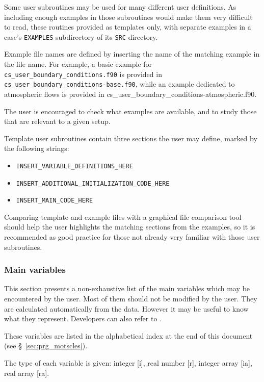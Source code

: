 {{{Some user subroutines may be used for many different user definitions. As
including enough examples in those subroutines would make them very
difficult to read, these routines provided as templates only, with
separate examples in a case's \texttt{EXAMPLES} subdirectory of its
\texttt{SRC} directory.

Example file names are defined by inserting the name of the matching example
in the file name. For example, a basic example for
\texttt{cs\_user\_boundary\_conditions.f90} is provided in \\
\texttt{cs\_user\_boundary\_conditions-base.f90}, while an example dedicated
to atmospheric flows is provided in
{cs\_user\_boundary\_conditions-atmospheric.f90}.

The user is encouraged to check what examples are available, and to study
those that are relevant to a given setup.

Template user subroutines contain three sections the user may define,
marked by the following strings:

\begin{itemize}
\item \texttt{INSERT\_VARIABLE\_DEFINITIONS\_HERE}
\item \texttt{INSERT\_ADDITIONAL\_INITIALIZATION\_CODE\_HERE}
\item \texttt{INSERT\_MAIN\_CODE\_HERE}
\end{itemize}

Comparing template and example files with a graphical file comparison tool
should help the user highlights the matching sections from the examples,
so it is recommended as good practice for those not already very familiar
with those user subroutines.

\subsubsection{Main variables}

This section presents a non-exhaustive list of the main variables which
may be encountered by the user. Most of them should not be modified by the
user. They are calculated automatically from the data. However it may be
useful to know what they represent.
Developers can also refer to \cite{theory}.

These variables are listed in the alphabetical index at the end of this
document (see \S~\ref{sec:prg_motscles}).

The type of each variable is given: integer [i], real number [r],
integer array [ia], real array [ra].

}}}
